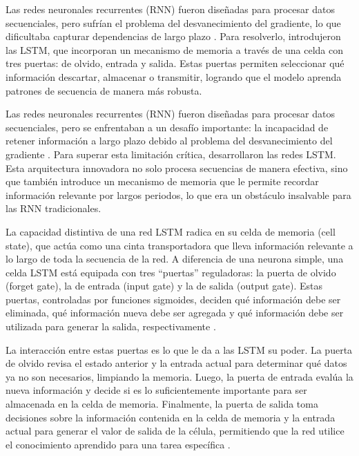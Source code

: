 
Las redes neuronales recurrentes (RNN) fueron diseñadas para procesar datos secuenciales, pero sufrían el problema del desvanecimiento del gradiente, lo que dificultaba capturar dependencias de largo plazo \cite{heaton2018ian}. Para resolverlo, \citeauthor{hochreiter1997long} introdujeron las LSTM, que incorporan un mecanismo de memoria a través de una celda con tres puertas: de olvido, entrada y salida. Estas puertas permiten seleccionar qué información descartar, almacenar o transmitir, logrando que el modelo aprenda patrones de secuencia de manera más robusta.

Las redes neuronales recurrentes (RNN) fueron diseñadas para procesar datos secuenciales, pero se enfrentaban a un desafío importante: la incapacidad de retener información a largo plazo debido al problema del desvanecimiento del gradiente \cite{heaton2018ian}. Para superar esta limitación crítica, \citeauthor{hochreiter1997long} \citeyear{hochreiter1997long} desarrollaron las redes LSTM. Esta arquitectura innovadora no solo procesa secuencias de manera efectiva, sino que también introduce un mecanismo de memoria que le permite recordar información relevante por largos periodos, lo que era un obstáculo insalvable para las RNN tradicionales.

La capacidad distintiva de una red LSTM radica en su celda de memoria (cell state), que actúa como una cinta transportadora que lleva información relevante a lo largo de toda la secuencia de la red. A diferencia de una neurona simple, una celda LSTM está equipada con tres ``puertas'' reguladoras: la puerta de olvido (forget gate), la de entrada (input gate) y la de salida (output gate). Estas puertas, controladas por funciones sigmoides, deciden qué información debe ser eliminada, qué información nueva debe ser agregada y qué información debe ser utilizada para generar la salida, respectivamente \cite{heaton2018ian}.

La interacción entre estas puertas es lo que le da a las LSTM su poder. La puerta de olvido revisa el estado anterior y la entrada actual para determinar qué datos ya no son necesarios, limpiando la memoria. Luego, la puerta de entrada evalúa la nueva información y decide si es lo suficientemente importante para ser almacenada en la celda de memoria. Finalmente, la puerta de salida toma decisiones sobre la información contenida en la celda de memoria y la entrada actual para generar el valor de salida de la célula, permitiendo que la red utilice el conocimiento aprendido para una tarea específica \cite{heaton2018ian}.

